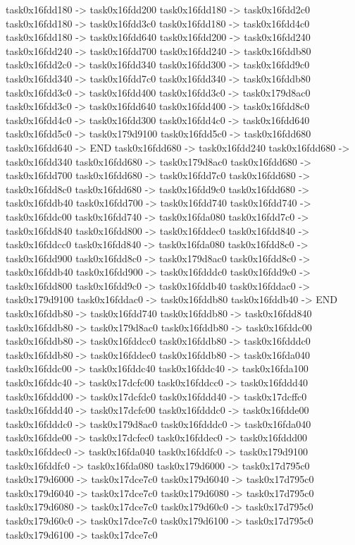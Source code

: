 {	task0x16fdd180 -> task0x16fdd200
	task0x16fdd180 -> task0x16fdd2c0
	task0x16fdd180 -> task0x16fdd3c0
	task0x16fdd180 -> task0x16fdd4c0
	task0x16fdd180 -> task0x16fdd640
	task0x16fdd200 -> task0x16fdd240
	task0x16fdd240 -> task0x16fdd700
	task0x16fdd240 -> task0x16fddb80
	task0x16fdd2c0 -> task0x16fdd340
	task0x16fdd300 -> task0x16fdd9c0
	task0x16fdd340 -> task0x16fdd7c0
	task0x16fdd340 -> task0x16fddb80
	task0x16fdd3c0 -> task0x16fdd400
	task0x16fdd3c0 -> task0x179d8ac0
	task0x16fdd3c0 -> task0x16fdd640
	task0x16fdd400 -> task0x16fdd8c0
	task0x16fdd4c0 -> task0x16fdd300
	task0x16fdd4c0 -> task0x16fdd640
	task0x16fdd5c0 -> task0x179d9100
	task0x16fdd5c0 -> task0x16fdd680
	task0x16fdd640 -> END
	task0x16fdd680 -> task0x16fdd240
	task0x16fdd680 -> task0x16fdd340
	task0x16fdd680 -> task0x179d8ac0
	task0x16fdd680 -> task0x16fdd700
	task0x16fdd680 -> task0x16fdd7c0
	task0x16fdd680 -> task0x16fdd8c0
	task0x16fdd680 -> task0x16fdd9c0
	task0x16fdd680 -> task0x16fddb40
	task0x16fdd700 -> task0x16fdd740
	task0x16fdd740 -> task0x16fddc00
	task0x16fdd740 -> task0x16fda080
	task0x16fdd7c0 -> task0x16fdd840
	task0x16fdd800 -> task0x16fddec0
	task0x16fdd840 -> task0x16fddcc0
	task0x16fdd840 -> task0x16fda080
	task0x16fdd8c0 -> task0x16fdd900
	task0x16fdd8c0 -> task0x179d8ac0
	task0x16fdd8c0 -> task0x16fddb40
	task0x16fdd900 -> task0x16fdddc0
	task0x16fdd9c0 -> task0x16fdd800
	task0x16fdd9c0 -> task0x16fddb40
	task0x16fddac0 -> task0x179d9100
	task0x16fddac0 -> task0x16fddb80
	task0x16fddb40 -> END
	task0x16fddb80 -> task0x16fdd740
	task0x16fddb80 -> task0x16fdd840
	task0x16fddb80 -> task0x179d8ac0
	task0x16fddb80 -> task0x16fddc00
	task0x16fddb80 -> task0x16fddcc0
	task0x16fddb80 -> task0x16fdddc0
	task0x16fddb80 -> task0x16fddec0
	task0x16fddb80 -> task0x16fda040
	task0x16fddc00 -> task0x16fddc40
	task0x16fddc40 -> task0x16fda100
	task0x16fddc40 -> task0x17dcfc00
	task0x16fddcc0 -> task0x16fddd40
	task0x16fddd00 -> task0x17dcfdc0
	task0x16fddd40 -> task0x17dcffc0
	task0x16fddd40 -> task0x17dcfc00
	task0x16fdddc0 -> task0x16fdde00
	task0x16fdddc0 -> task0x179d8ac0
	task0x16fdddc0 -> task0x16fda040
	task0x16fdde00 -> task0x17dcfec0
	task0x16fddec0 -> task0x16fddd00
	task0x16fddec0 -> task0x16fda040
	task0x16fddfc0 -> task0x179d9100
	task0x16fddfc0 -> task0x16fda080
	task0x179d6000 -> task0x17d795c0
	task0x179d6000 -> task0x17dce7c0
	task0x179d6040 -> task0x17d795c0
	task0x179d6040 -> task0x17dce7c0
	task0x179d6080 -> task0x17d795c0
	task0x179d6080 -> task0x17dce7c0
	task0x179d60c0 -> task0x17d795c0
	task0x179d60c0 -> task0x17dce7c0
	task0x179d6100 -> task0x17d795c0
	task0x179d6100 -> task0x17dce7c0
}
